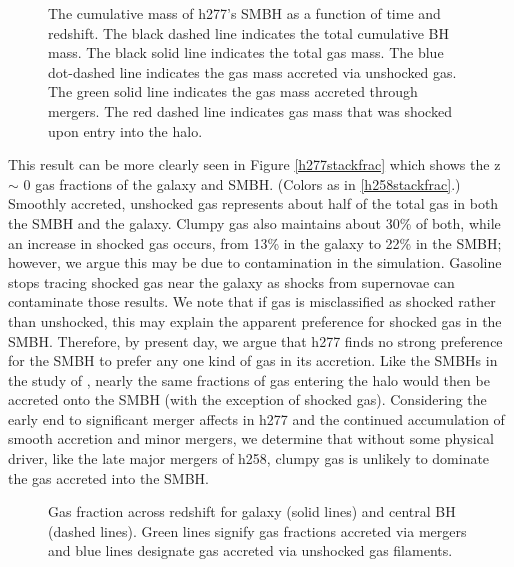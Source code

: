 \documentclass[12pt,headA,chapB]{fiskthesis}
\begin{document}
\begin{figure}[h]
\centerline{}
\caption[GASOLINE h277 SMBH Cumulative Mass]{The cumulative mass of h277's SMBH as a function of time and redshift. The black dashed line indicates the total cumulative BH mass. The black solid line indicates the total gas mass. The blue dot-dashed line indicates the gas mass accreted via unshocked gas. The green solid line indicates the gas mass accreted through mergers. The red dashed line indicates gas mass that was shocked upon entry into the halo.}
\label{h277allmassgas} 
\end{figure}

This result can be more clearly seen in Figure \ref{h277stackfrac} which shows the z $\sim$ 0 gas fractions of the galaxy and SMBH. (Colors as in \ref{h258stackfrac}.) Smoothly accreted, unshocked gas represents about half of the total gas in both the SMBH and the galaxy. Clumpy gas also maintains about 30\% of both, while an increase in shocked gas occurs, from 13\% in the galaxy to 22\% in the SMBH; however, we argue this may be due to contamination in the simulation. Gasoline stops tracing shocked gas near the galaxy as shocks from supernovae can contaminate those results. We note that if gas is misclassified as shocked rather than unshocked, this may explain the apparent preference for shocked gas in the SMBH.
Therefore, by present day, we argue that h277 finds no strong preference for the SMBH to prefer any one kind of gas in its accretion. Like the SMBHs in the study of \cite{Bellovary2013}, nearly the same fractions of gas entering the halo would then be accreted onto the SMBH (with the exception of shocked gas). Considering the early end to significant merger affects in h277 and the continued accumulation of smooth accretion and minor mergers, we determine that without some physical driver, like the late major mergers of h258, clumpy gas is unlikely to dominate the gas accreted into the SMBH. 

\begin{figure}[h]
\centerline{}
\caption[GASOLINE h258 Galaxy and SMBH Gas Fractions Across Time]{Gas fraction across redshift for galaxy (solid lines) and central BH (dashed lines). Green lines signify gas fractions accreted via mergers and blue lines designate gas accreted via unshocked gas filaments.}
\label{h277numfrac} 
\end{figure}
\end{document}
